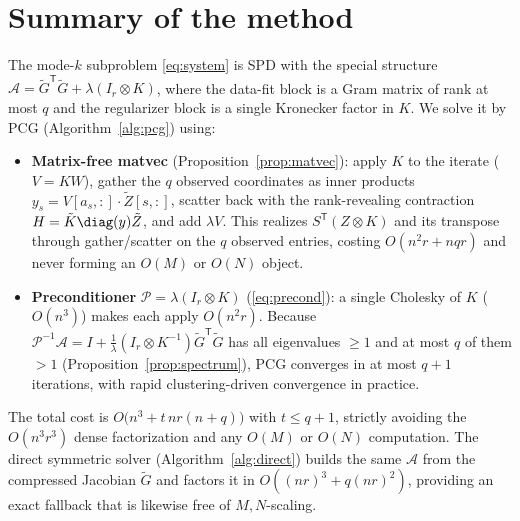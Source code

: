 \section{Summary of the method}

The mode-$k$ subproblem \eqref{eq:system} is SPD with the special structure
$\mathcal A=\tilde G^{\mathsf T}\tilde G+\lambda(I_r\otimes K)$, where the data-fit
block is a Gram matrix of rank at most $q$ and the regularizer block is a single
Kronecker factor in $K$. We solve it by PCG (Algorithm~\ref{alg:pcg}) using:
\begin{itemize}\setlength\itemsep{0.2em}
  \item \textbf{Matrix-free matvec} (Proposition~\ref{prop:matvec}): apply
        $K$ to the iterate ($V=KW$), gather the $q$ observed coordinates as inner
        products $y_s=V[a_s,:]\cdot\tilde Z[s,:]$, scatter back with the rank-revealing
        contraction $H=\tilde K\diag(y)\tilde Z$, and add $\lambda V$. This realizes
        $S^{\mathsf T}(Z\otimes K)$ and its transpose through gather/scatter on the $q$
        observed entries, costing $O(n^2r+nqr)$ and never forming an $O(M)$ or $O(N)$
        object.
  \item \textbf{Preconditioner} $\mathcal P=\lambda(I_r\otimes K)$
        (\eqref{eq:precond}): a single Cholesky of $K$ ($O(n^3)$) makes each apply
        $O(n^2r)$. Because $\mathcal P^{-1}\mathcal A=I+\tfrac1\lambda(I_r\otimes
        K^{-1})\tilde G^{\mathsf T}\tilde G$ has all eigenvalues $\ge1$ and at most
        $q$ of them $>1$ (Proposition~\ref{prop:spectrum}), PCG converges in at most
        $q+1$ iterations, with rapid clustering-driven convergence in practice.
\end{itemize}
The total cost is $O\!\big(n^3+t\,nr(n+q)\big)$ with $t\le q+1$, strictly avoiding the
$O(n^3r^3)$ dense factorization and any $O(M)$ or $O(N)$ computation. The direct
symmetric solver (Algorithm~\ref{alg:direct}) builds the same $\mathcal A$ from the
compressed Jacobian $\tilde G$ and factors it in $O((nr)^3+q(nr)^2)$, providing an exact
fallback that is likewise free of $M,N$-scaling.


